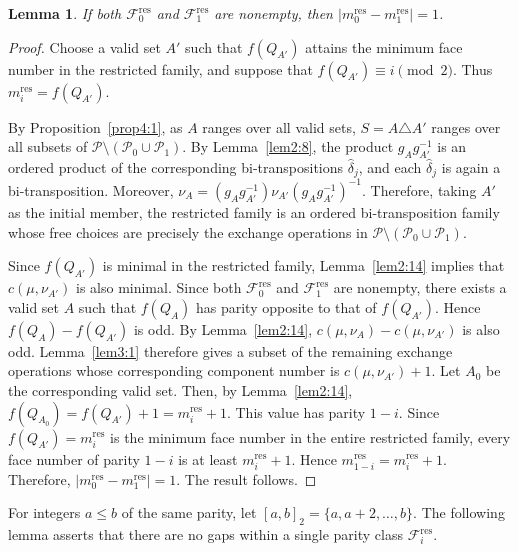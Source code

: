 \documentclass[12pt]{article}
\newtheorem{lemma}[theorem]{Lemma}
\theoremstyle{definition}
\newcommand{\intervaltwo}[2]{[#1,#2]_2}
\begin{document}
\begin{lemma}
\label{lem4:1}
If both $\mathcal F_0^{\mathrm{res}}$ and
$\mathcal F_1^{\mathrm{res}}$ are nonempty, then
$\bigl|m_0^{\mathrm{res}}-m_1^{\mathrm{res}}\bigr|=1$.
\end{lemma}
 \begin{proof}
Choose a valid set $A'$ such that $f(Q_{A'})$ attains the minimum
face number in the restricted family, and suppose that
$f(Q_{A'})\equiv i\pmod 2$. Thus
$m_i^{\mathrm{res}}=f(Q_{A'})$.


By Proposition~\ref{prop4:1}, as $A$ ranges over all valid sets,
$S=A\triangle A'$ ranges over all subsets of
$\mathcal P\setminus(\mathcal P_0\cup\mathcal P_1)$.
By Lemma~\ref{lem2:8}, the product
$g_Ag_{A'}^{-1}$ is an ordered product of the corresponding
bi-transpositions $\widehat\delta_j$, and each
$\widehat\delta_j$ is again a bi-transposition. Moreover,
$\nu_A=(g_Ag_{A'}^{-1})\nu_{A'}(g_Ag_{A'}^{-1})^{-1}$.
Therefore, taking $A'$ as the initial member,
the restricted family is an ordered bi-transposition family
whose free choices are precisely the
exchange operations in
$\mathcal P\setminus(\mathcal P_0\cup\mathcal P_1)$.

Since $f(Q_{A'})$ is minimal in the restricted family,
Lemma~\ref{lem2:14} implies that
$c(\mu,\nu_{A'})$ is also minimal. Since both
$\mathcal F_0^{\mathrm{res}}$ and
$\mathcal F_1^{\mathrm{res}}$ are nonempty, there exists a valid set
$A$ such that $f(Q_A)$ has parity opposite to that of $f(Q_{A'})$.
Hence $f(Q_A)-f(Q_{A'})$ is odd. By Lemma~\ref{lem2:14},
$c(\mu,\nu_A)-c(\mu,\nu_{A'})$ is also odd.
Lemma~\ref{lem3:1} therefore gives a subset of the remaining exchange
operations whose corresponding component number is
$c(\mu,\nu_{A'})+1$. Let $A_0$ be the corresponding valid set.
Then, by Lemma~\ref{lem2:14},
$f(Q_{A_0})=f(Q_{A'})+1=m_i^{\mathrm{res}}+1$.
This value has parity $1-i$.
Since
$f(Q_{A'})=m_i^{\mathrm{res}}$
is the minimum face number in the entire restricted family, every face
number of parity $1-i$ is at least
$m_i^{\mathrm{res}}+1$.
 Hence
$m_{1-i}^{\mathrm{res}}=m_i^{\mathrm{res}}+1$.
Therefore,
$\bigl|m_0^{\mathrm{res}}-m_1^{\mathrm{res}}\bigr|=1$. The result follows.
\end{proof}



For integers $a\le b$ of the same parity, let $\intervaltwo{a}{b}=\{a,a+2,\ldots,b\}.$
The following lemma asserts that there are no gaps within a single parity class $\mathcal F_i^{\mathrm{res}}$.
\end{document}
